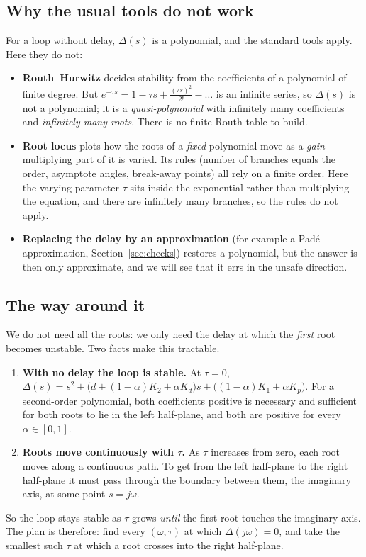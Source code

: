 \documentclass[11pt,a4paper]{article}
\theoremstyle{definition}
\begin{document}
\subsection{Why the usual tools do not work}
For a loop without delay, $\Delta(s)$ is a polynomial, and the standard
tools apply. Here they do not:
\begin{itemize}\setlength{\itemsep}{2pt}
\item \textbf{Routh--Hurwitz} decides stability from the coefficients of
a polynomial of finite degree. But
$e^{-\tau s} = 1 - \tau s + \tfrac{(\tau s)^2}{2!} - \dots$ is an
infinite series, so $\Delta(s)$ is not a polynomial; it is a
\emph{quasi-polynomial} with infinitely many coefficients and
\emph{infinitely many roots}. There is no finite Routh table to build.
\item \textbf{Root locus} plots how the roots of a \emph{fixed}
polynomial move as a \emph{gain} multiplying part of it is varied. Its
rules (number of branches equals the order, asymptote angles, break-away
points) all rely on a finite order. Here the varying parameter $\tau$
sits inside the exponential rather than multiplying the equation, and
there are infinitely many branches, so the rules do not apply.
\item \textbf{Replacing the delay by an approximation} (for example a
Pad\'e approximation, Section~\ref{sec:checks}) restores a polynomial,
but the answer is then only approximate, and we will see that it errs in
the unsafe direction.
\end{itemize}

\subsection{The way around it}
We do not need all the roots: we only need the delay at which the
\emph{first} root becomes unstable. Two facts make this tractable.
\begin{enumerate}\setlength{\itemsep}{2pt}
\item \textbf{With no delay the loop is stable.} At $\tau = 0$,
$\Delta(s) = s^2 + \bigl(d + (1-\alpha)K_2 + \alpha K_d\bigr)s
+ \bigl((1-\alpha)K_1 + \alpha K_p\bigr)$. For a second-order
polynomial, both coefficients positive is necessary and sufficient for
both roots to lie in the left half-plane, and both are positive for
every $\alpha \in [0,1]$.
\item \textbf{Roots move continuously with $\tau$.} As $\tau$ increases
from zero, each root moves along a continuous path. To get from the left
half-plane to the right half-plane it must pass through the boundary
between them, the imaginary axis, at some point $s = j\omega$.
\end{enumerate}
So the loop stays stable as $\tau$ grows \emph{until} the first root
touches the imaginary axis. The plan is therefore: find every
$(\omega, \tau)$ at which $\Delta(j\omega) = 0$, and take the smallest
such $\tau$ at which a root crosses into the right half-plane.
\end{document}
